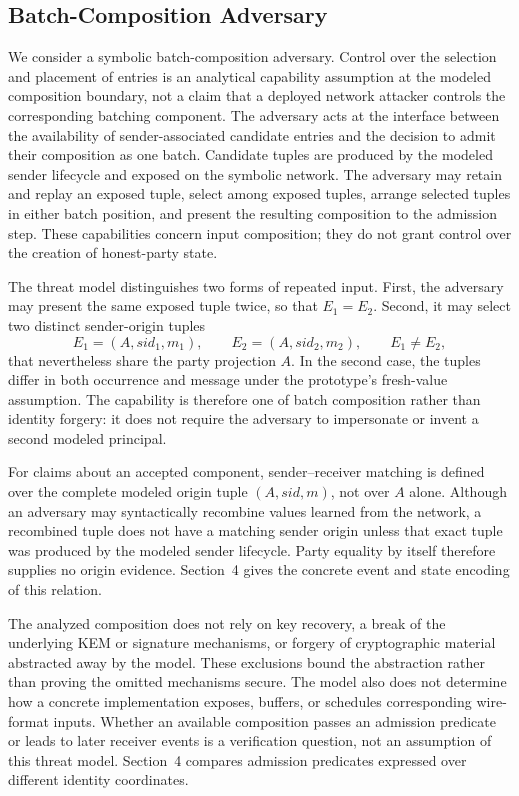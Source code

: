 \subsection{Batch-Composition Adversary}

We consider a symbolic batch-composition adversary. Control over the selection
and placement of entries is an analytical capability assumption at the modeled
composition boundary, not a claim that a deployed network attacker controls
the corresponding batching component. The adversary acts at the interface between
the availability of sender-associated candidate entries and the decision to
admit their composition as one batch. Candidate tuples are produced by the
modeled sender lifecycle and exposed on the symbolic network. The adversary may
retain and replay an exposed tuple, select among exposed tuples, arrange
selected tuples in either batch position, and present the resulting
composition to the admission step. These capabilities concern input
composition; they do not grant control over the creation of honest-party
state.

The threat model distinguishes two forms of repeated input. First, the
adversary may present the same exposed tuple twice, so that \(E_1=E_2\).
Second, it may select two distinct sender-origin tuples
\begin{equation}
  E_1=(A,\mathit{sid}_1,m_1),
  \qquad
  E_2=(A,\mathit{sid}_2,m_2),
  \qquad
  E_1\neq E_2,
  \label{eq:repeated-party-capability}
\end{equation}
that nevertheless share the party projection \(A\). In the second case, the
tuples differ in both occurrence and message under the prototype's fresh-value
assumption. The capability is therefore
one of batch composition rather than identity forgery: it does not require the
adversary to impersonate or invent a second modeled principal.

For claims about an accepted component, sender--receiver matching is defined
over the complete modeled origin tuple \((A,\mathit{sid},m)\), not over \(A\)
alone.
Although an adversary may syntactically recombine values learned from the
network, a recombined tuple does not have a matching sender origin unless that
exact tuple was produced by the modeled sender lifecycle. Party equality by
itself therefore supplies no origin evidence. Section~4 gives the concrete
event and state encoding of this relation.

The analyzed composition does not rely on key recovery, a break of the
underlying KEM or signature mechanisms, or forgery of cryptographic material
abstracted away by the model. These exclusions bound the abstraction rather
than proving the omitted mechanisms secure. The model also does not determine
how a concrete implementation exposes, buffers, or schedules corresponding
wire-format inputs. Whether an available composition passes an admission
predicate or leads to later receiver events is a verification question, not an
assumption of this threat model. Section~4 compares admission predicates
expressed over different identity coordinates.

